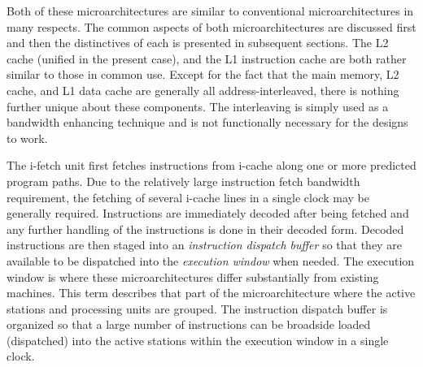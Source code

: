 \documentclass{book}
\begin{document}
Both of these microarchitectures are similar to conventional
microarchitectures in many respects.  
The common aspects of both microarchitectures are discussed first and
then the distinctives of each is presented in subsequent sections.
The L2 cache (unified in the present case), and the L1 instruction 
cache are both rather similar to those in common use.
Except for the fact that the main memory, L2 cache, and L1 data
cache are generally all address-interleaved, there is nothing further
unique about these components.   The interleaving is simply
used as a bandwidth enhancing technique and is not functionally
necessary for the designs to work.

The i-fetch unit first fetches instructions from i-cache
along one or more predicted program paths.
Due to the relatively large instruction fetch bandwidth
requirement, the fetching
of several i-cache lines in a single clock may be generally required.
Instructions are immediately
decoded after being fetched and any further
handling of the instructions is done in their decoded
form.
Decoded instructions are then staged
into an \textit{instruction dispatch buffer}
so that they are available to be dispatched
into the \textit{execution window} when needed.  
The execution window is where these
microarchitectures differ substantially from existing machines.
This term describes that part of the microarchitecture where
the active stations and processing units are grouped.
The instruction dispatch buffer is organized so that
a large number of instructions can be broadside loaded (dispatched) into the
active stations within the execution window in a single clock.
\end{document}
